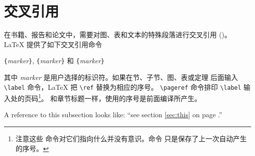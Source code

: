 \section{交叉引用}

在书籍、报告和论文中，需要对图、表和文本的特殊段落进行交叉引用 ()。
\LaTeX{} 提供了如下交叉引用命令
\begin{lscommand}
\verb|{|\emph{marker}\verb|}|,
\verb|{|\emph{marker}\verb|}| 和 \verb|{|\emph{marker}\verb|}|
\end{lscommand}
\noindent
其中 \emph{marker} 是用户选择的标识符。如果在节、子节、图、表或定理
后面输入 \verb|\label| 命令，\LaTeX{} 把 \verb|\ref| 替换为相应的序号。
\verb|\pageref| 命令排印 \verb|\label| 输入处的页码\footnote{注意这些
命令对它们指向什么并没有意识。命令  只是保存了上一次自动产生的序号。}。
和章节标题一样，使用的序号是前面编译所产生。

%
\begin{example}
A reference to this subsection
\label{sec:this} looks like:
``see section \ref{sec:this} on
page \pageref{sec:this}.''
\end{example}

